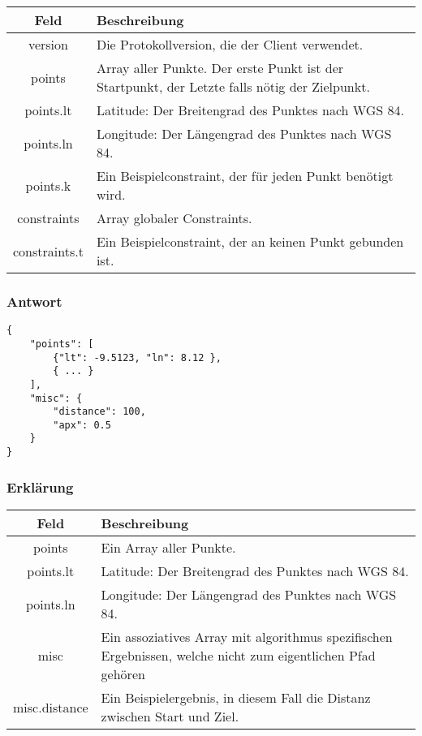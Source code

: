 \documentclass[ngerman,titlepage,parskip=true]{scrartcl}
\begin{document}
	    \noindent \begin{tabular}{|c|p{12cm}|}
	    	\hline
	    	\textbf{Feld} & \textbf{Beschreibung} \\ 
	    	\hline \hline
	    	
	    	version & Die Protokollversion, die der Client verwendet.\\
	    	\hline
	    	
	    	points & Array aller Punkte. Der erste Punkt ist der Startpunkt, der Letzte falls nötig der Zielpunkt. \\ 
	    	\hline
	    	
	    	points.lt & Latitude: Der Breitengrad des Punktes nach WGS 84. \\ 
	    	\hline
	    	
	    	points.ln & Longitude: Der Längengrad des Punktes nach WGS 84. \\
	    	\hline
	    	
	    	points.k & Ein Beispielconstraint, der für jeden Punkt benötigt wird.\\ 
	    	\hline
	    	
	    	constraints & Array globaler Constraints.\\ 
	    	\hline
	    	
	    	constraints.t & Ein Beispielconstraint, der an keinen Punkt gebunden ist.\\ 
	    	\hline
	    \end{tabular}
    
    \subsubsection{Antwort}	
	\begin{lstlisting}
{
	"points": [
		{"lt": -9.5123, "ln": 8.12 },
		{ ... }
	],
	"misc": {
		"distance": 100,
		"apx": 0.5
	}
}
	\end{lstlisting}
	
		\subsubsection*{Erklärung}
		
		\begin{tabular}{|c|p{12cm}|}
			\hline
			\textbf{Feld} & \textbf{Beschreibung} \\ 
			\hline \hline
			
			points & Ein Array aller Punkte.\\
			\hline
			
	    	points.lt & Latitude: Der Breitengrad des Punktes nach WGS 84. \\ 
	    	\hline
	    	
	    	points.ln & Longitude: Der Längengrad des Punktes nach WGS 84. \\
	    	\hline
	    	
	    	misc & Ein assoziatives Array mit algorithmus spezifischen Ergebnissen, welche nicht zum eigentlichen Pfad gehören \\
	    	\hline
	    	
	    	misc.distance & Ein Beispielergebnis, in diesem Fall die Distanz zwischen Start und Ziel.\\
	    	\hline
		\end{tabular}
\end{document}
